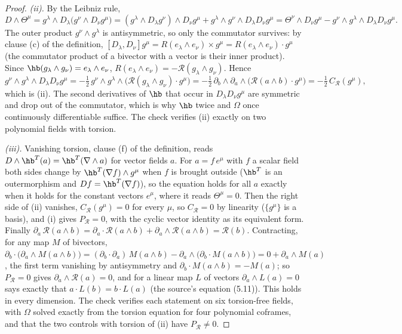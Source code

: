 \begin{proof}
\emph{(ii).} By the Leibniz rule,
\[
D\wedge\Theta^{\mu} = g^{\lambda}\wedge D_{\lambda}\bigl(g^{\nu}\wedge D_{\nu}g^{\mu}\bigr) = (g^{\lambda}\wedge D_{\lambda}g^{\nu})\wedge D_{\nu}g^{\mu} + g^{\lambda}\wedge g^{\nu}\wedge D_{\lambda}D_{\nu}g^{\mu} = \Theta^{\nu}\wedge D_{\nu}g^{\mu} - g^{\nu}\wedge g^{\lambda}\wedge D_{\lambda}D_{\nu}g^{\mu} .
\]
The outer product $g^{\nu}\wedge g^{\lambda}$ is antisymmetric, so only the commutator survives: by clause (c) of the definition, $[D_{\lambda}, D_{\nu}]g^{\mu} = R(e_{\lambda}\wedge e_{\nu})\times g^{\mu} = R(e_{\lambda}\wedge e_{\nu})\cdot g^{\mu}$ (the commutator product of a bivector with a vector is their inner product). Since $\hb(g_{\lambda}\wedge g_{\nu}) = e_{\lambda}\wedge e_{\nu}$, $R(e_{\lambda}\wedge e_{\nu}) = -\mathcal{R}(g_{\lambda}\wedge g_{\nu})$. Hence
\[
g^{\nu}\wedge g^{\lambda}\wedge D_{\lambda}D_{\nu}g^{\mu} = -\tfrac12\,g^{\nu}\wedge g^{\lambda}\wedge\bigl(\mathcal{R}(g_{\lambda}\wedge g_{\nu})\cdot g^{\mu}\bigr) = -\tfrac12\,\partial_{b}\wedge\partial_{a}\wedge\bigl(\mathcal{R}(a\wedge b)\cdot g^{\mu}\bigr) = -\tfrac12\,C_{\mathcal{R}}(g^{\mu}),
\]
which is (ii). The second derivatives of $\hb$ that occur in $D_{\lambda}D_{\nu}g^{\mu}$ are symmetric and drop out of the commutator, which is why $\hb$ twice and $\Omega$ once continuously differentiable suffice. The check verifies (ii) exactly on two polynomial fields with torsion.

\emph{(iii).} Vanishing torsion, clause (f) of the definition, reads $D\wedge\hb^{T}(a) = \hb^{T}(\nabla\wedge a)$ for vector fields $a$. For $a = f\,e^{\mu}$ with $f$ a scalar field both sides change by $\hb^{T}(\nabla f)\wedge g^{\mu}$ when $f$ is brought outside ($\hb^{T}$ is an outermorphism and $D f = \hb^{T}(\nabla f)$), so the equation holds for all $a$ exactly when it holds for the constant vectors $e^{\mu}$, where it reads $\Theta^{\mu} = 0$. Then the right side of (ii) vanishes, $C_{\mathcal{R}}(g^{\mu}) = 0$ for every $\mu$, so $C_{\mathcal{R}} = 0$ by linearity ($\{g^{\mu}\}$ is a basis), and (i) gives $P_{\mathcal{R}} = 0$, with the cyclic vector identity as its equivalent form. Finally $\partial_{a}\,\mathcal{R}(a\wedge b) = \partial_{a}\cdot\mathcal{R}(a\wedge b) + \partial_{a}\wedge\mathcal{R}(a\wedge b) = \mathcal{R}(b)$. Contracting, for any map $M$ of bivectors, $\partial_{b}\cdot\bigl(\partial_{a}\wedge M(a\wedge b)\bigr) = (\partial_{b}\cdot\partial_{a})\,M(a\wedge b) - \partial_{a}\wedge\bigl(\partial_{b}\cdot M(a\wedge b)\bigr) = 0 + \partial_{a}\wedge M(a)$, the first term vanishing by antisymmetry and $\partial_{b}\cdot M(a\wedge b) = -M(a)$; so $P_{\mathcal{R}} = 0$ gives $\partial_{a}\wedge\mathcal{R}(a) = 0$, and for a linear map $L$ of vectors $\partial_{a}\wedge L(a) = 0$ says exactly that $a\cdot L(b) = b\cdot L(a)$ (the source's equation (5.11)). This holds in every dimension. The check verifies each statement on six torsion-free fields, with $\Omega$ solved exactly from the torsion equation for four polynomial coframes, and that the two controls with torsion of (ii) have $P_{\mathcal{R}} \neq 0$.


\end{proof}
